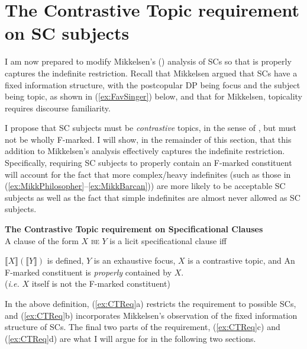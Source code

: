 \documentclass[
	letterpaper,
]{article}
\begin{document}
\section{The Contrastive Topic requirement on SC subjects}\label{sec:MainArgument}
I am now prepared to modify Mikkelsen's (\citeyear{mikkelsen2005copular}) analysis of SCs so that is properly captures the indefinite restriction.
Recall that Mikkelsen argued that SCs have a fixed information structure, with the postcopular DP being focus and the subject being topic, as shown in (\ref{ex:FavSinger}) below, and that for Mikkelsen, topicality requires discourse familiarity.
\begin{exe}
\end{exe}
I propose that SC subjects must be \textit{contrastive} topics, in the sense of \textcite{constant2014diss}, but must not be wholly F-marked.
I will show, in the remainder of this section, that this addition to Mikkelsen's analysis effectively captures the indefinite restriction.
Specifically, requiring SC subjects to properly contain an F-marked constituent will account for the fact that more complex/heavy indefinites (such as those in (\ref{ex:MikkPhilosopher}--\ref{ex:MikkBarcan})) are more likely to be acceptable SC subjects as well as the fact that simple indefinites are almost never allowed as SC subjects.

\begin{exe}
\ex\label{ex:CTReq} \textbf{The Contrastive Topic requirement on Specificational Clauses}\\
A clause of the form $X$ \textsc{be} $Y$ is a licit specificational clause iff
\begin{xlist}
\ex $\llbracket X\rrbracket(\llbracket Y\rrbracket)$ is defined,
\ex $Y$ is an exhaustive focus, \parencite{mikkelsen2005copular}
\ex $X$ is a contrastive topic, and
\ex An F-marked constituent is \textit{properly} contained by $X$.\\
(\textit{i.e.} $X$ itself is not the F-marked constituent)
\end{xlist}
\end{exe}

In the above definition, (\ref{ex:CTReq}a) restricts the requirement to possible SCs, and (\ref{ex:CTReq}b) incorporates Mikkelsen's observation of the fixed information structure of SCs.
The final two parts of the requirement, (\ref{ex:CTReq}c) and (\ref{ex:CTReq}d) are what I will argue for in the following two sections.
\end{document}
